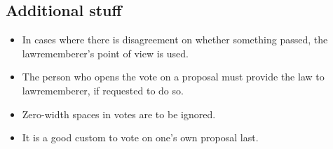 \documentclass[11pt]{article}
\begin{document}
\subsection{Additional stuff}

\begin{itemize}
\item In cases where there is disagreement on whether something passed, the lawrememberer's point of view is used.
\item The person who opens the vote on a proposal must provide the law to lawrememberer, if requested to do so.
\item Zero-width spaces in votes are to be ignored.
\item It is a good custom to vote on one's own proposal last.
\end{itemize}
\end{document}
